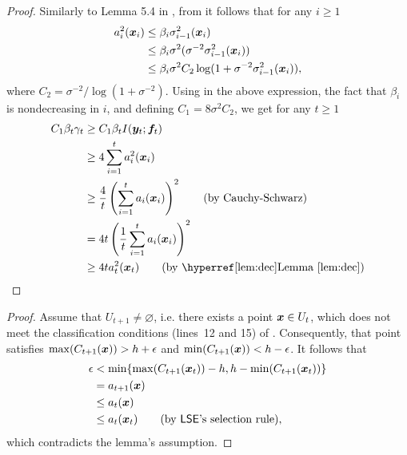 \begin{proof}
Similarly to Lemma 5.4 in \cite{srinivas10},
from  it follows that for any $i \geq 1$
\begin{align*}
a_i^2(\bm{x}_i) &\leq \beta_i\sigma_{i-1}^2(\bm{x}_i)\\
&\leq \beta_i\sigma^2(\sigma^{-2}\sigma_{i-1}^2(\bm{x}_i))\\
&\leq \beta_i\sigma^2 C_2\log(1 + \sigma^{-2}\sigma_{i-1}^2(\bm{x}_i)),
\end{align*}
where $C_2 = \sigma^{-2}/\log(1 + \sigma^{-2})$.
Using  in the above expression, the fact that $\beta_i$
is nondecreasing in $i$, and defining $C_1 = 8\sigma^2C_2$,
we get for any $t \geq 1$
\begin{align*}
C_1\beta_t\gamma_t &\geq C_1\beta_t I(\*y_t; \*f_t)\\
                   &\geq 4\sum_{i=1}^t a_i^2(\*x_i)\\
                   &\geq \frac{4}{t}\left(\sum_{i=1}^t a_i(\*x_i)\right)^2 \tag*{\textrm{(by Cauchy-Schwarz)}}\\
                   &= 4t \left(\frac{1}{t}\sum_{i=1}^t a_i(\*x_i)\right)^2\\
                   &\geq 4t a_t^2(\*x_t) \tag*{\textrm{(by \lemmaref{lem:dec})}}
\end{align*}
\end{proof}

\begin{proof}
Assume that $U_{t+1} \neq \varnothing$, i.e. there exists a point
$\bm{x} \in U_t$, which does not meet the classification conditions
(lines~12 and 15) of . Consequently, that point
satisfies $\max(C_{t+1}(\bm{x})) > h + \epsilon$ and
$\min(C_{t+1}(\bm{x})) < h - \epsilon$. It follows that
\begin{align*}
\epsilon &< \min\{\max(C_{t+1}(\*x_t))-h, h-\min(C_{t+1}(\*x_t))\}\\
&= a_{t+1}(\*x)\\
&\leq a_t(\*x)\\
&\leq a_t(\*x_t) \tag{by \acl's selection rule},
\end{align*}
which contradicts the lemma's assumption.
\end{proof}

